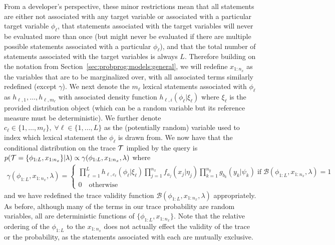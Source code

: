 From a developer's perspective, these minor restrictions mean that all \sample statements are
either not associated with any target variable or associated with a particular target variable $\phi_{\ell}$, that \sample
statements associated with the target variables will never be evaluated more than once (but might never
be evaluated if there are multiple possible \sample statements associated with a particular $\phi_{\ell}$), and
that the total number of \sample statements associated with the target variables is always $L$.
Therefore building on the notation from Section~\ref{sec:probprog:models:general}, we will redefine $x_{1:n_x}$
as the variables that are to be marginalized over, with all associated terms similarly redefined (except $\gamma$).
We next denote the $m_{\ell}$ lexical \sample statements associated with $\phi_{\ell}$ as 
$h_{\ell,1},\dots,h_{\ell,m_{\ell}}$ with associated density function $h_{\ell,i}(\phi_{\ell} | \xi_{\ell})$ where
$\xi_{\ell}$ is the provided distribution object (which can be a random variable but its reference measure
must be deterministic).  We further denote $c_{\ell} \in \{1,\dots,m_{\ell}\}, \; 
\forall \ell \in \{1,\dots,L\}$ as the (potentially random) variable used to index which lexical \sample statement
the $\phi_{\ell}$ is drawn from.  We now have that the conditional distribution on the trace $\mathcal{T}$ implied
by the query is $p(\mathcal{T} = \{\phi_{1:L},x_{1:n_x}\} | \lambda) \propto \gamma(\phi_{1:L},x_{1:n_x}, \lambda)$
where
\begin{align}
\label{eq:bopp:joint}
\gamma(\phi_{1:L},x_{1:n_x}, \lambda) = \begin{cases}
\prod_{\ell=1}^{L}
h_{\ell,c_{\ell}} (\phi_{\ell} | \xi_{\ell})
\prod_{j=1}^{n_x} 
f_{a_j}(x_j | \eta_j)
\prod_{k=1}^{n_y}
g_{b_k}(y_k | \psi_k) \; \text{if} \; \mathcal{B}(\phi_{1:L},x_{1:n_x},\lambda)=1 \\
0 \quad \text{otherwise}
\end{cases}
\end{align}
and we have redefined the trace validity function $\mathcal{B}(\phi_{1:L},x_{1:n_x},\lambda)$ appropriately.
As before, although many of the terms in our trace probability are random variables, all are deterministic
functions of $\{\phi_{1:L},x_{1:n_x}\}$.  Note that the relative ordering of the $\phi_{1:L}$ to the $x_{1:n_x}$
does not actually effect the validity of the trace or the probability, as the \sample statements associated with
each are mutually exclusive.


